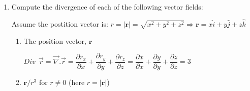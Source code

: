 \documentclass[fleqn]{article}
\begin{document}
\begin{enumerate}
    \textcolor{hwColor}{
      The gradient of $\phi$ at the point $(-1,-1,2)$ is a vector normal to the surface at this point. The gradient is obtained as follows: \\ \\
      $
        \overrightarrow{\nabla} \phi=\dfrac{\partial \phi}{\partial x} \hat{i}+\dfrac{\partial \phi}{\partial y} \hat{j}+\dfrac{\partial \phi}{\partial z}\hat{k}  \\
        \\
        \overrightarrow{\nabla} \phi=(y^3z^2) \hat{i}+(3xy^2z^2) \hat{j}+(2xy^3z) \hat{k} \\
        \\
        \overrightarrow{\nabla} \phi(-1,-1,2)=(-1)^3(2)^2 \hat{i}+3(-1)(-1)^2(2)^2 \hat{j}+2(-1)(-1)^3(2) \hat{k}=-4 \hat{i}-12 \hat{j}+4 \hat{k} \\
        \\
        \overrightarrow{n}=\dfrac{-4 \hat{i}-12 \hat{j}+4 \hat{k}}{\sqrt{(-4)^2+(-12)^2+4^2}}=-\dfrac{4}{4\sqrt{11}} \hat{i}-\dfrac{12}{4 \sqrt{11}} \hat{j}+\dfrac{4}{4\sqrt{11}} \hat{k} \\
        \\
        \\
        \Longrightarrow \overrightarrow{n}=-\dfrac{1}{\sqrt{11}} \hat{i}-\dfrac{3}{\sqrt{11}} \hat{j}+\dfrac{1}{\sqrt{11}} \hat{k}
      $
    }


    \item Compute the divergence of each of the following vector fields:
    
      \textcolor{hwColor}{ Assume the postition vector is: $r=|\mathbf{r}|=\sqrt{x^2+y^2+z^2} \Rightarrow \mathbf{r}=x \hat{i}+y \hat{j}+z \hat{k}$ }
      \begin{enumerate}
        \item The position vector, $\mathbf{r}$

          \textcolor{hwColor}{
            $
              Div ~~ \overrightarrow{r}=\overrightarrow{\nabla}.\overrightarrow{r}=\dfrac{\partial r_x}{\partial x}+\dfrac{\partial r_y}{\partial y}+\dfrac{\partial r_z}{\partial z}=\dfrac{\partial x}{\partial x}+\dfrac{\partial y}{\partial y}+\dfrac{\partial z}{\partial z}=3
            $
          }

        \item $\mathbf{r}/r^3$ for $r\neq 0$  (here $r=|\mathbf{r}|$)


\end{enumerate}
\end{enumerate}
\end{document}
